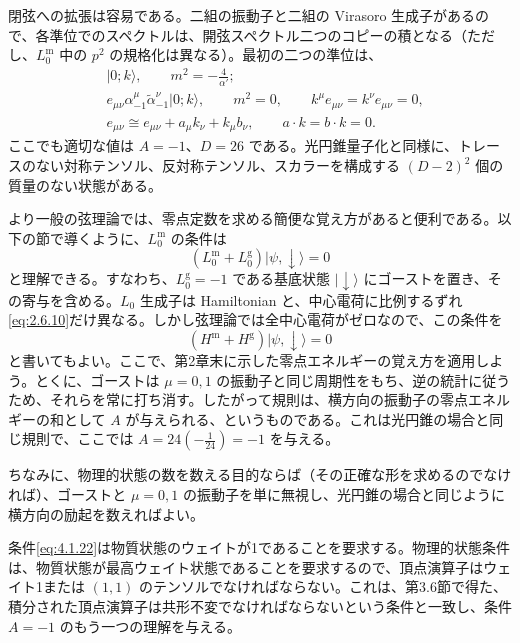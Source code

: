閉弦への拡張は容易である。二組の振動子と二組の Virasoro 生成子があるので、各準位でのスペクトルは、開弦スペクトル二つのコピーの積となる（ただし、$L^{\mathrm m}_0$ 中の $p^2$ の規格化は異なる）。最初の二つの準位は、
\begin{align}
&|0;k\rangle,\qquad m^2=-\frac4{\alpha'};\tag{4.1.21a}\label{eq:4.1.21a}\\
&e_{\mu\nu}\alpha^\mu_{-1}\widetilde\alpha^\nu_{-1}|0;k\rangle,
\qquad m^2=0,\qquad k^\mu e_{\mu\nu}=k^\nu e_{\mu\nu}=0,
\tag{4.1.21b}\label{eq:4.1.21b}\\
&e_{\mu\nu}\cong e_{\mu\nu}+a_\mu k_\nu+k_\mu b_\nu,
\qquad a\cdot k=b\cdot k=0.
\tag{4.1.21c}\label{eq:4.1.21c}
\end{align}
ここでも適切な値は $A=-1$、$D=26$ である。光円錐量子化と同様に、トレースのない対称テンソル、反対称テンソル、スカラーを構成する $(D-2)^2$ 個の質量のない状態がある。


より一般の弦理論では、零点定数を求める簡便な覚え方があると便利である。以下の節で導くように、$L^{\mathrm m}_0$ の条件は
\begin{equation}
(L^{\mathrm m}_0+L^{\mathrm g}_0)|\psi,\downarrow\rangle=0
\tag{4.1.22}\label{eq:4.1.22}
\end{equation}
と理解できる。すなわち、$L^{\mathrm g}_0=-1$ である基底状態 $|\downarrow\rangle$ にゴーストを置き、その寄与を含める。$L_0$ 生成子は Hamiltonian と、中心電荷に比例するずれ\eqref{eq:2.6.10}だけ異なる。しかし弦理論では全中心電荷がゼロなので、この条件を
\begin{equation}
(H^{\mathrm m}+H^{\mathrm g})|\psi,\downarrow\rangle=0
\tag{4.1.23}\label{eq:4.1.23}
\end{equation}
と書いてもよい。ここで、第2章末に示した零点エネルギーの覚え方を適用しよう。とくに、ゴーストは $\mu=0,1$ の振動子と同じ周期性をもち、逆の統計に従うため、それらを常に打ち消す。したがって規則は、横方向の振動子の零点エネルギーの和として $A$ が与えられる、というものである。これは光円錐の場合と同じ規則で、ここでは $A=24(-\tfrac1{24})=-1$ を与える。

ちなみに、物理的状態の数を数える目的ならば（その正確な形を求めるのでなければ）、ゴーストと $\mu=0,1$ の振動子を単に無視し、光円錐の場合と同じように横方向の励起を数えればよい。

条件\eqref{eq:4.1.22}は物質状態のウェイトが1であることを要求する。物理的状態条件は、物質状態が最高ウェイト状態であることを要求するので、頂点演算子はウェイト1または $(1,1)$ のテンソルでなければならない。これは、第3.6節で得た、積分された頂点演算子は共形不変でなければならないという条件と一致し、条件 $A=-1$ のもう一つの理解を与える。

